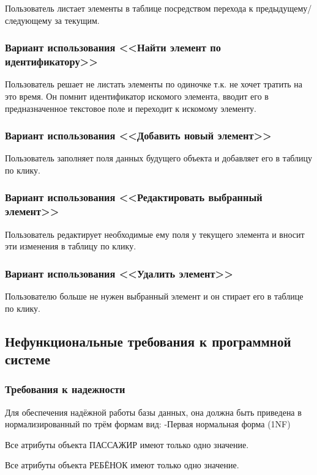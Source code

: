 Пользователь листает элементы в таблице посредством перехода к предыдущему/следующему за текущим.

\subsubsection{Вариант использования <<Найти элемент по идентификатору>>}

Пользователь решает не листать элементы по одиночке т.к. не хочет тратить на это время. Он помнит идентификатор искомого элемента, вводит его в предназначенное текстовое поле и переходит к искомому элементу.

\subsubsection{Вариант использования <<Добавить новый элемент>>}

Пользователь заполняет поля данных будущего объекта и добавляет его в таблицу по клику.

\subsubsection{Вариант использования <<Редактировать выбранный элемент>>}

Пользователь редактирует необходимые ему поля у текущего элемента и вносит эти изменения в таблицу по клику.

\subsubsection{Вариант использования <<Удалить элемент>>}

Пользователю больше не нужен выбранный элемент и он стирает его в таблице по клику.

\subsection {Нефункциональные требования к программной системе}
\subsubsection{Требования к надежности}
Для обеспечения надёжной работы базы данных, она должна быть приведена в нормализированный по трём формам вид:
-Первая нормальная форма (1NF)

Все атрибуты объекта ПАССАЖИР имеют только одно значение.

Все атрибуты объекта РЕБЁНОК имеют только одно значение.

